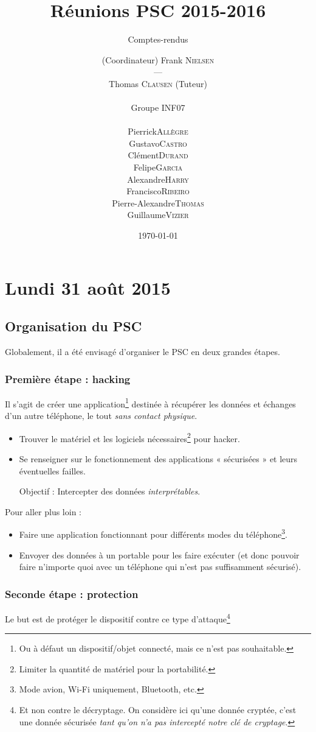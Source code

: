 \documentclass[a4paper, 11pt]{article}
\title{Réunions PSC 2015-2016}
\author{\begin{minipage}{0.42\textwidth}
		\begin{flushright}
		(Coordinateur) Frank \textsc{Nielsen}
		\end{flushright}
		\end{minipage}
		\quad --- \quad
		\begin{minipage}{0.42\textwidth}
		\begin{flushleft}
		Thomas \textsc{Clausen} (Tuteur)
		\end{flushleft}
		\end{minipage} \\[2mm]
		Groupe INF07 \\
		\begin{minipage}{0.45\textwidth}
		\begin{center}
		\begin{tabular}{rl}
		Pierrick & \textsc{Allègre} \\
		Gustavo & \textsc{Castro} \\
		Clément & \textsc{Durand} \\
		Felipe & \textsc{Garcia}
		\end{tabular}
		\end{center}
		\end{minipage}
		\begin{minipage}{0.45\textwidth}
		\begin{center}
		\begin{tabular}{rl}
		Alexandre & \textsc{Harry} \\
		Francisco & \textsc{Ribeiro} \\
		Pierre-Alexandre & \textsc{Thomas} \\
		Guillaume & \textsc{Vizier}
		\end{tabular}
		\end{center}
		\end{minipage}}
\subtitle{Comptes-rendus}
\date{\today}
\begin{document}
\maketitle
\tableofcontents\clearpage

\section{Lundi 31 août 2015}

\subsection{Organisation du PSC}
Globalement, il a été envisagé d'organiser le PSC en deux grandes étapes.
\subsubsection{Première étape : hacking}
Il s'agit de créer une application\footnote{Ou à défaut un dispositif/objet connecté, mais ce n'est pas souhaitable.} destinée à récupérer les données et échanges d'un autre téléphone, le tout \emph{sans contact physique}.

\begin{itemize}
	\item Trouver le matériel et les logiciels nécessaires\footnote{Limiter la quantité de matériel pour la portabilité.} pour hacker.
	\item Se renseigner sur le fonctionnement des applications « sécurisées » et leurs éventuelles failles.
	\item[Objectif :] Intercepter des données \emph{interprétables}.
\end{itemize}

Pour aller plus loin :
\begin{itemize}
	\item Faire une application fonctionnant pour différents modes du téléphone\footnote{Mode avion, Wi-Fi uniquement, Bluetooth, etc.}.
	\item Envoyer des données à un portable pour les faire exécuter (et donc pouvoir faire n'importe quoi avec un téléphone qui n'est pas suffisamment sécurisé).
\end{itemize}

\subsubsection{Seconde étape : protection}
Le but est de protéger le dispositif contre ce type d'attaque\footnote{Et non contre le décryptage. On considère ici qu'une donnée cryptée, c'est une donnée sécurisée \emph{tant qu'on n'a pas intercepté notre clé de cryptage}.}
\end{document}
